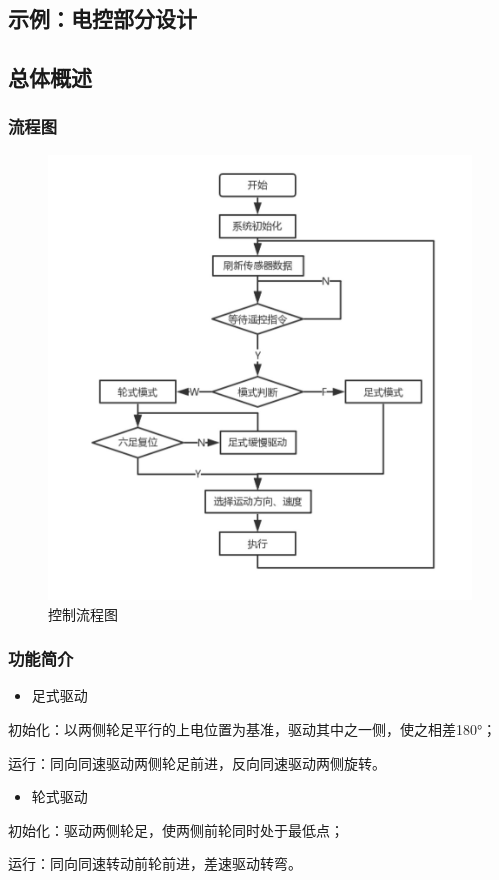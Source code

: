 \documentclass[a4paper, 11pt]{article}   %
\begin{document}
\begin{CJK}{UTF8}{gbsn}
\begin{spacing}{1.15}
\newpage
\section{示例：电控部分设计}
\subsection{总体概述}
\subsubsection{流程图}
 \begin{figure}[H]
\centering
\includegraphics[width=.8\textwidth]{chap5//fig1.jpg}
\caption{控制流程图}
\end{figure}
\subsubsection{功能简介}
\begin{itemize}
\item 足式驱动
\end{itemize}\par
初始化：以两侧轮足平行的上电位置为基准，驱动其中之一侧，使之相差180°；\par
运行：同向同速驱动两侧轮足前进，反向同速驱动两侧旋转。
\begin{itemize}
\item 轮式驱动
\end{itemize}\par
初始化：驱动两侧轮足，使两侧前轮同时处于最低点；\par
运行：同向同速转动前轮前进，差速驱动转弯。


\end{spacing}
\end{CJK}
\end{document}
